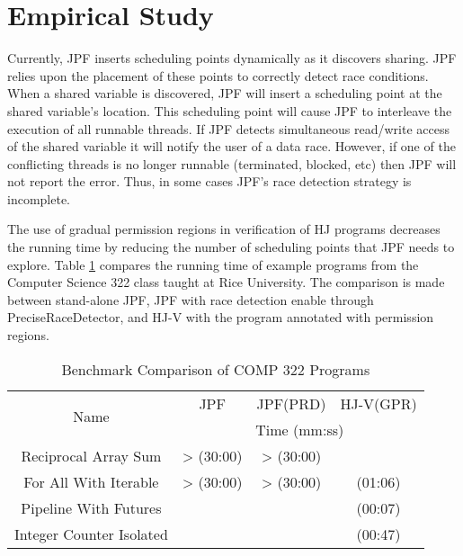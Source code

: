 \section{Empirical Study}
\begin{comment}
Briefly present (1 column) JPFs current strategy for managing
sharring. Present tables of results showing JPF performance with and
without permission regions. Include a table showing all the
benchmarks. Indicate the number of iterations and the number of
annotations.
\end{comment}

Currently, JPF inserts scheduling points dynamically as it
discovers sharing. JPF relies upon the placement of these points to
correctly detect race conditions. When a shared variable is discovered, JPF will
insert a scheduling point at the shared variable's location. This scheduling
point will cause JPF to interleave the execution of all runnable threads. If
JPF detects simultaneous read/write access of the shared variable it will notify
the user of a data race. However, if one of the conflicting threads is no longer
runnable (terminated, blocked, etc) then JPF will not report the error. Thus, in
some cases JPF's race detection strategy is incomplete. 

The use of gradual permission regions in verification of HJ programs decreases
the running time by reducing the number of scheduling points that JPF needs to
explore. Table \ref{table:1} compares the running time of example
programs from the Computer Science 322 class taught at Rice University. The
comparison is made between stand-alone JPF, JPF with race detection enable
through PreciseRaceDetector, and HJ-V with the program annotated with permission
regions.

\begin{table}[h]
\centering
\caption{Benchmark Comparison of COMP 322 Programs}
\label{table:1}
\begin{tabular}{|c|c|c|c|}
\hline
\multirow{2}{*}{Name} & JPF    & JPF(PRD)   & HJ-V(GPR)   \\ \cline{2-4} 
                      & \multicolumn{3}{c|}{Time (mm:ss)} \\ \hline
Reciprocal Array Sum  & > (30:00) & > (30:00)  &             \\ \hline
For All With Iterable & > (30:00) & > (30:00)  & (01:06)     \\ \hline
Pipeline With Futures &           &            & (00:07) \\ \hline
Integer Counter Isolated &        &            & (00:47) \\ \hline
\end{tabular}
\end{table}

